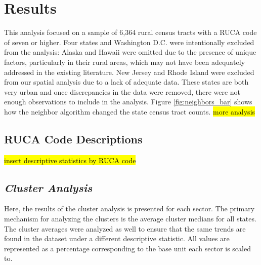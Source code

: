 \chapter{Results}	

This analysis focused on a sample of 6,364 rural census tracts with a RUCA code of seven or higher. Four states and Washington D.C. were intentionally excluded from the analysis: Alaska and Hawaii were omitted due to the presence of unique factors, particularly in their rural areas, which may not have been adequately addressed in the existing literature.  New Jersey and Rhode Island were excluded from our spatial analysis due to a lack of adequate data. These states are both very urban and once discrepancies in the data were removed, there were not enough observations to include in the analysis.  Figure \ref{fig:neighbors_bar} shows how the neighbor algorithm changed the state census tract counts. \hl{more analysis}


\section{RUCA Code Descriptions}

\hl{insert descriptive statistics by RUCA code}

\section{\textit{Cluster Analysis}}

Here, the results of the cluster analysis is presented for each sector. The primary mechanism for analyzing the clusters is the average cluster medians for all states. The cluster averages were analyzed as well to ensure that the same trends are found in the dataset under a different descriptive statistic. All values are represented as a percentage corresponding to the base unit each sector is scaled to.

